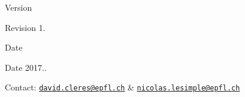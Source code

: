 \begin{DoxyVersion}{Version}

\end{DoxyVersion}
\begin{DoxyParagraph}{Revision}
1. 
\end{DoxyParagraph}


\begin{DoxyDate}{Date}

\end{DoxyDate}
\begin{DoxyParagraph}{Date}
2017.. 
\end{DoxyParagraph}


Contact\+: \href{mailto:david.cleres@epfl.ch}{\tt david.\+cleres@epfl.\+ch} \& \href{mailto:nicolas.lesimple@epfl.ch}{\tt nicolas.\+lesimple@epfl.\+ch} 